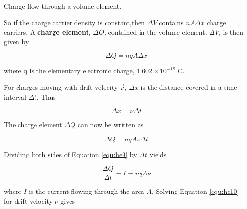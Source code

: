 \begin{marginfigure}
\caption{Charge flow through a volume element.}
\label{fig:he2}
\end{marginfigure}

So if the charge carrier density is constant,then $\Delta V$ contains $nA\Delta x$ charge carriers. A {\bf charge element}, $\Delta Q$, contained in the volume element, $\Delta V$, is then given by

\begin{equation}
\Delta Q=nqA\Delta x
\label{equ:he7}
\end{equation}

\noindent where q is the elementary electronic charge, $1.602\times10^{-19}$ C.

For charges moving with drift velocity $\vec{\nu}$, $\Delta x$ is the distance covered in a time interval $\Delta t$. Thus

\begin{equation}
\Delta x=\nu \Delta t
\label{equ:he8}
\end{equation}

\noindent The charge element $\Delta Q$ can now be written as

\begin{equation}
\Delta Q=nqA\nu \Delta t
\label{equ:he9}
\end{equation}

\noindent Dividing both sides of Equation \ref{equ:he9} by $\Delta t$ yields

\begin{equation}
\dfrac{\Delta Q}{\Delta t}=I=nqA\nu
\label{equ:he10}
\end{equation}

\noindent where $I$ is the current flowing through the area $A$. Solving Equation \ref{equ:he10} for drift velocity $\nu$ gives

